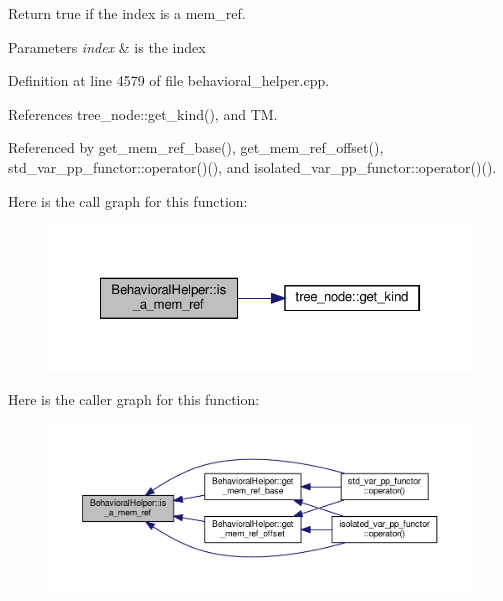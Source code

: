 Return true if the index is a mem\+\_\+ref. 


\begin{DoxyParams}{Parameters}
{\em index} & is the index \\
\hline
\end{DoxyParams}


Definition at line 4579 of file behavioral\+\_\+helper.\+cpp.



References tree\+\_\+node\+::get\+\_\+kind(), and TM.



Referenced by get\+\_\+mem\+\_\+ref\+\_\+base(), get\+\_\+mem\+\_\+ref\+\_\+offset(), std\+\_\+var\+\_\+pp\+\_\+functor\+::operator()(), and isolated\+\_\+var\+\_\+pp\+\_\+functor\+::operator()().

Here is the call graph for this function\+:
\nopagebreak
\begin{figure}[H]
\begin{center}
\leavevmode
\includegraphics[width=322pt]{dd/db2/classBehavioralHelper_af7df51d84377f2c1dbff35b28bd027b6_cgraph}
\end{center}
\end{figure}
Here is the caller graph for this function\+:
\nopagebreak
\begin{figure}[H]
\begin{center}
\leavevmode
\includegraphics[width=350pt]{dd/db2/classBehavioralHelper_af7df51d84377f2c1dbff35b28bd027b6_icgraph}
\end{center}
\end{figure}
\mbox{\label{classBehavioralHelper_a1c00023a8c27e720ca4b125e6980d595}} 

